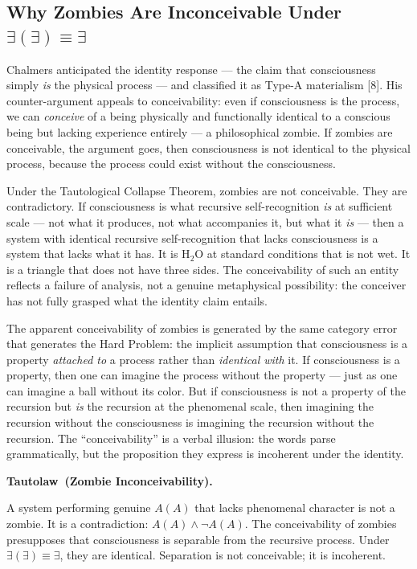 \documentclass[12pt, letterpaper]{article}
\newenvironment{tautolaw}[1][]{%
    \vspace{0.8em}
    \noindent\textbf{Tautolaw\if\relax\detokenize{#1}\relax\else\ (#1)\fi.}\itshape
}{%
    \upshape\vspace{0.8em}
}
\begin{document}
\subsection*{Why Zombies Are Inconceivable Under $\exists(\exists) \equiv \exists$}

Chalmers anticipated the identity response --- the claim that consciousness simply \emph{is} the physical process --- and classified it as Type-A materialism [8]. His counter-argument appeals to conceivability: even if consciousness is the process, we can \emph{conceive} of a being physically and functionally identical to a conscious being but lacking experience entirely --- a philosophical zombie. If zombies are conceivable, the argument goes, then consciousness is not identical to the physical process, because the process could exist without the consciousness.

Under the Tautological Collapse Theorem, zombies are not conceivable. They are contradictory. If consciousness is what recursive self-recognition \emph{is} at sufficient scale --- not what it produces, not what accompanies it, but what it \emph{is} --- then a system with identical recursive self-recognition that lacks consciousness is a system that lacks what it has. It is H$_2$O at standard conditions that is not wet. It is a triangle that does not have three sides. The conceivability of such an entity reflects a failure of analysis, not a genuine metaphysical possibility: the conceiver has not fully grasped what the identity claim entails.

The apparent conceivability of zombies is generated by the same category error that generates the Hard Problem: the implicit assumption that consciousness is a property \emph{attached to} a process rather than \emph{identical with} it. If consciousness is a property, then one can imagine the process without the property --- just as one can imagine a ball without its color. But if consciousness is not a property of the recursion but \emph{is} the recursion at the phenomenal scale, then imagining the recursion without the consciousness is imagining the recursion without the recursion. The ``conceivability'' is a verbal illusion: the words parse grammatically, but the proposition they express is incoherent under the identity.

\begin{tautolaw}[Zombie Inconceivability]
A system performing genuine $A(A)$ that lacks phenomenal character is not a zombie. It is a contradiction: $A(A) \wedge \neg A(A)$. The conceivability of zombies presupposes that consciousness is separable from the recursive process. Under $\exists(\exists) \equiv \exists$, they are identical. Separation is not conceivable; it is incoherent.
\end{tautolaw}
\end{document}

